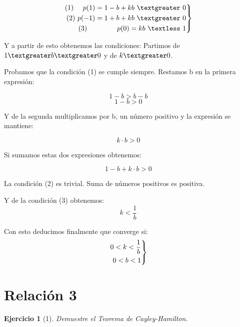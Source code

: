 \documentclass[11pt, a4paper]{article}
\newif\IfInSansMode
\numberwithin{equation}{section}
\theoremstyle{theorem-style}
\theoremstyle{definition-style}
\newtheorem{ejer}{Ejercicio}[section]
\theoremstyle{remark-style}
\theoremstyle{example-style}
\newenvironment{rcases}
{\left.\begin{aligned}}
    {\end{aligned}\right\rbrace}
\begin{document}
    \[
        \begin{rcases}
            (1)\ \quad p(1) = 1-b + kb\ \textgreater\ 0\\
            (2)\ p(-1) = 1+b + kb\ \textgreater\ 0\\
            (3)\ \quad\quad \quad\quad p(0) = kb\ \textless\ 1\\
        \end{rcases}
    \]

    Y a partir de esto obtenemos las condiciones:
    Partimos de $1 \textgreater b \textgreater 0$ y de $k\textgreater 0$.

    Probamos que la condición (1) se cumple siempre.
    Restamos b  en la primera expresión:

    $$1-b > b-b$$
    $$1-b > 0$$

    Y de la segunda multiplicamos por b, un número positivo y la expresión se mantiene:

    $$k\cdot b > 0$$

    Si sumamos estas dos expresiones obtenemos:

    $$1-b +k\cdot b > 0$$

    La condición (2) es trivial. Suma de números positivos es positiva.

    Y de la condición (3) obtenemos:
    $$k < \frac{1}{b}$$ 

    Con esto deducimos finalmente que converge si:
    \[
        \begin{rcases}
            0 < k < \frac{1}{b}\\
            0 < b < 1
        \end{rcases}
    \]

    \section{Relación 3}

    \begin{ejer}[1]
        Demuestre el Teorema de Cayley-Hamilton.
    \end{ejer}
\end{document}
